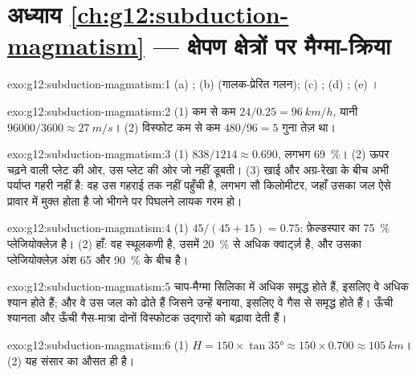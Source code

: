 \section*{अध्याय \ref{ch:g12:subduction-magmatism} --- क्षेपण क्षेत्रों पर मैग्मा-क्रिया}

\begin{solution}{exo:g12:subduction-magmatism:1}
(a) ; (b)  (गालक-प्रेरित गलन); (c) ;
(d) ; (e) ।
\end{solution}

\begin{solution}{exo:g12:subduction-magmatism:2}
(1) कम से कम $24/0.25 = \qty{96}{km/h}$, यानी $\num{96000}/3600 \approx
\qty{27}{m/s}$। (2) विस्फोट कम से कम $480/96 = 5$ गुना तेज़ था।
\end{solution}

\begin{solution}{exo:g12:subduction-magmatism:3}
(1) $838/1214 \approx 0.690$, लगभग \qty{69}{\percent}। (2) ऊपर चढ़ने वाली
प्लेट की ओर, उस प्लेट की ओर जो नहीं डूबती। (3) खाई और
अग्र-रेखा के बीच  अभी पर्याप्त गहरी नहीं है: वह उस गहराई तक नहीं पहुँची है,
लगभग सौ किलोमीटर, जहाँ उसका जल ऐसे प्रावार में मुक्त होता है जो भीगने पर
पिघलने लायक गरम हो।
\end{solution}

\begin{solution}{exo:g12:subduction-magmatism:4}
(1) $45/(45 + 15) = 0.75$: फ़ेल्डस्पार का \qty{75}{\percent}
प्लेजियोक्लेज़ है। (2) हाँ: वह स्थूलकणी है, उसमें
\qty{20}{\percent} से अधिक क्वार्ट्ज़ है, और उसका प्लेजियोक्लेज़ अंश 65 और
\qty{90}{\percent} के बीच है।
\end{solution}

\begin{solution}{exo:g12:subduction-magmatism:5}
चाप-मैग्मा सिलिका में अधिक समृद्ध होते हैं, इसलिए वे अधिक श्यान होते हैं; और वे
उस जल को ढोते हैं जिसने उन्हें बनाया, इसलिए वे गैस से समृद्ध होते हैं। ऊँची श्यानता और
ऊँची गैस-मात्रा दोनों विस्फोटक उद्गारों को बढ़ावा देती हैं।
\end{solution}

\begin{solution}{exo:g12:subduction-magmatism:6}
(1) $H = 150 \times \tan\ang{35} \approx 150 \times 0.700 \approx
\qty{105}{km}$। (2) यह संसार का औसत ही है।
\end{solution}

